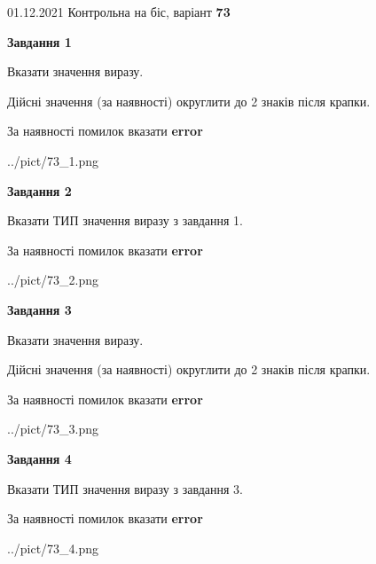 \documentclass[11pt, ukrainian]{article}
\begin{document}
{01.12.2021 Контрольна на біс, варіант  \No \textbf { 73 }\par}
{
\begin {large}
{\begin {center}\textbf{Завдання 1}\end {center}}\par
Вказати значення виразу. \par
Дійсні значення (за наявності) округлити до 2 знаків після крапки. \par
За наявності помилок вказати \textbf{error}

\begin{center}
	{../pict/73_1.png}
\end{center}
\newpage

{\begin {center}\textbf{Завдання 2}\end {center}}\par
Вказати ТИП значення виразу з завдання 1. \par
За наявності помилок вказати \textbf{error}

\begin{center}
	{../pict/73_2.png}
\end{center}
\newpage

{\begin {center}\textbf{Завдання 3}\end {center}}\par
Вказати значення виразу. \par
Дійсні значення (за наявності) округлити до 2 знаків після крапки. \par
За наявності помилок вказати \textbf{error}

\begin{center}
	{../pict/73_3.png}
\end{center}
\newpage

{\begin {center}\textbf{Завдання 4}\end {center}}\par
Вказати ТИП значення виразу з завдання 3. \par
За наявності помилок вказати \textbf{error}

\begin{center}
	{../pict/73_4.png}
\end{center}
\newpage


\end{large}}
\end{document}
